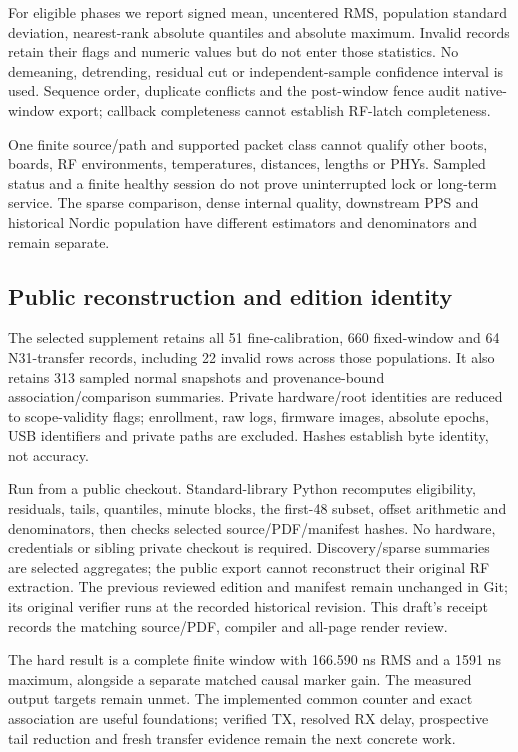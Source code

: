 \documentclass[10pt,letterpaper]{article}
\begin{document}
For eligible phases we report signed mean, uncentered RMS, population standard deviation, nearest-rank absolute quantiles and absolute maximum. Invalid records retain their flags and numeric values but do not enter those statistics. No demeaning, detrending, residual cut or independent-sample confidence interval is used. Sequence order, duplicate conflicts and the post-window fence audit native-window export; callback completeness cannot establish RF-latch completeness.

One finite source/path and supported packet class cannot qualify other boots, boards, RF environments, temperatures, distances, lengths or PHYs. Sampled status and a finite healthy session do not prove uninterrupted lock or long-term service. The sparse comparison, dense internal quality, downstream PPS and historical Nordic population have different estimators and denominators and remain separate.

\subsection{Public reconstruction and edition identity}
The selected supplement \cite{supplement} retains all 51 fine-calibration, 660 fixed-window and 64 N31-transfer records, including 22 invalid rows across those populations. It also retains 313 sampled normal snapshots and provenance-bound association/comparison summaries. Private hardware/root identities are reduced to scope-validity flags; enrollment, raw logs, firmware images, absolute epochs, USB identifiers and private paths are excluded. Hashes establish byte identity, not accuracy.

Run  from a public checkout. Standard-library Python recomputes eligibility, residuals, tails, quantiles, minute blocks, the first-48 subset, offset arithmetic and denominators, then checks selected source/PDF/manifest hashes. No hardware, credentials or sibling private checkout is required. Discovery/sparse summaries are selected aggregates; the public export cannot reconstruct their original RF extraction. The previous reviewed edition and manifest remain unchanged in Git; its original verifier runs at the recorded historical revision. This draft's receipt records the matching source/PDF, compiler and all-page render review.

The hard result is a complete finite window with 166.590 ns RMS and a 1591 ns maximum, alongside a separate matched causal marker gain. The measured output targets remain unmet. The implemented common counter and exact association are useful foundations; verified TX, resolved RX delay, prospective tail reduction and fresh transfer evidence remain the next concrete work.
\end{document}
